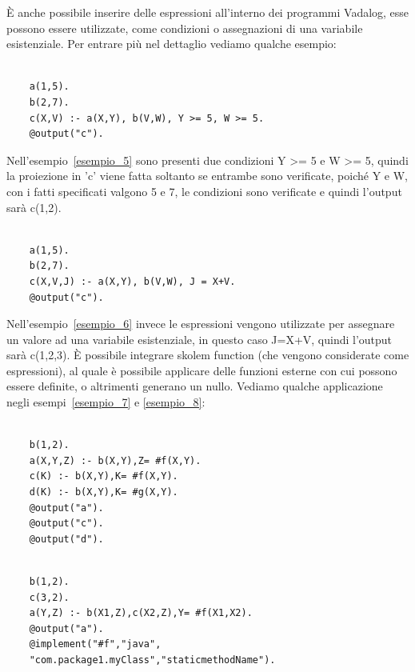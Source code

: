 È anche possibile inserire delle espressioni all'interno dei programmi Vadalog, esse possono essere utilizzate, come condizioni o assegnazioni di una variabile esistenziale. Per entrare più nel dettaglio vediamo qualche esempio: 
\begin{example}\label{esempio_5}
\normalfont
{}
\begin{lstlisting}

	a(1,5). 
	b(2,7). 
	c(X,V) :- a(X,Y), b(V,W), Y >= 5, W >= 5. 
	@output("c"). 
\end{lstlisting}
\end{example} 
Nell'esempio~\ref{esempio_5} sono presenti due condizioni Y >= 5 e W >= 5, quindi la proiezione in 'c' viene fatta soltanto se entrambe sono verificate, poiché Y e W, con i fatti specificati valgono 5 e 7, le condizioni sono verificate e quindi l'output sarà c(1,2). \newline
\begin{example}\label{esempio_6}
\normalfont
{}
\begin{lstlisting}

	a(1,5). 
	b(2,7). 
	c(X,V,J) :- a(X,Y), b(V,W), J = X+V. 
	@output("c").
\end{lstlisting}
\end{example}
Nell'esempio~\ref{esempio_6} invece le espressioni vengono utilizzate per assegnare un valore ad una variabile esistenziale, in questo caso J=X+V, quindi l'output sarà c(1,2,3). \newline
È possibile integrare skolem function (che vengono considerate come espressioni), al quale è possibile applicare delle funzioni esterne con cui possono essere definite, o altrimenti generano un nullo. Vediamo qualche applicazione negli esempi~\ref{esempio_7} e \ref{esempio_8}:
\begin{example}\label{esempio_7}
\normalfont
{}
\begin{lstlisting}

	b(1,2). 
	a(X,Y,Z) :- b(X,Y),Z= #f(X,Y). 
	c(K) :- b(X,Y),K= #f(X,Y). 
	d(K) :- b(X,Y),K= #g(X,Y). 
	@output("a"). 
	@output("c"). 
	@output("d"). 
\end{lstlisting}
\end{example}
\begin{example}\label{esempio_8}
\normalfont
{}
\begin{lstlisting}

	b(1,2). 
	c(3,2). 
	a(Y,Z) :- b(X1,Z),c(X2,Z),Y= #f(X1,X2). 
	@output("a"). 
	@implement("#f","java",
	"com.package1.myClass","staticmethodName").
\end{lstlisting}
\end{example}
